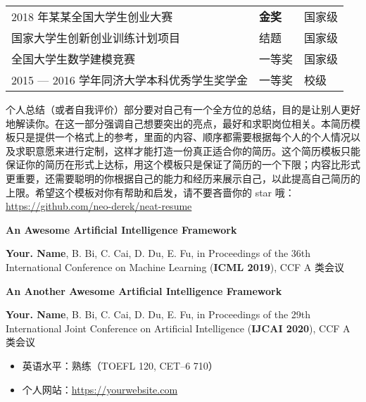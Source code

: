 \documentclass[10pt, a4paper]{article}
\begin{document}
    \setlength\tabcolsep{0pt}
    \renewcommand{\arraystretch}{1.5}
    \begin{longtable}[l]{lll}
        2018 年某某全国大学生创业大赛 & \hspace*{2em}\textbf{金奖} & \hspace*{2em}国家级\\
        
        国家大学生创新创业训练计划项目 & \hspace*{2em}结题 & \hspace*{2em}国家级\\
        
        全国大学生数学建模竞赛 & \hspace*{2em}一等奖 & \hspace*{2em}国家级\\
        
        2015 --- 2016 学年同济大学本科优秀学生奖学金 & \hspace*{2em}一等奖 & \hspace*{2em}校级\\
    \end{longtable}
    
    
    \hspace*{2em}个人总结（或者自我评价）部分要对自己有一个全方位的总结，目的是让别人更好地解读你。在这一部分强调自己想要突出的亮点，最好和求职岗位相关。本简历模板只是提供一个格式上的参考，里面的内容、顺序都需要根据每个人的个人情况以及求职意愿来进行定制，这样才能打造一份真正适合你的简历。这个简历模板只能保证你的简历在形式上达标，用这个模板只是保证了简历的一个下限；内容比形式更重要，还需要聪明的你根据自己的能力和经历来展示自己，以此提高自己简历的上限。希望这个模板对你有帮助和启发，请不要吝啬你的 star 哦：\href{https://github.com/neo-derek/neat-resume}{\courierprime\fontsize{10}{12}\selectfont https://github.com/neo-derek/neat-resume}
    
    
    \textbf{An Awesome Artificial Intelligence Framework}
    
    \textbf{Your. Name}, B. Bi, C. Cai, D. Du, E. Fu, in Proceedings of the 36th International Conference on Machine Learning (\textbf{ICML 2019}), CCF A 类会议
    
    \mydelimiter
    
    \textbf{An Another Awesome Artificial Intelligence Framework}
    
    \textbf{Your. Name}, B. Bi, C. Cai, D. Du, E. Fu, in Proceedings of the 29th International Joint Conference on Artificial Intelligence (\textbf{IJCAI 2020}), CCF A 类会议
    
    \mydelimiter
    
    
    \begin{itemize}[leftmargin=*, topsep=0pt]
        \item 英语水平：熟练（TOEFL 120, CET--6 710）
        \item 个人网站：\href{https://yourwebsite.com}{\courierprime\fontsize{10}{12}\selectfont https://yourwebsite.com}
    \end{itemize}
	
\end{document}

